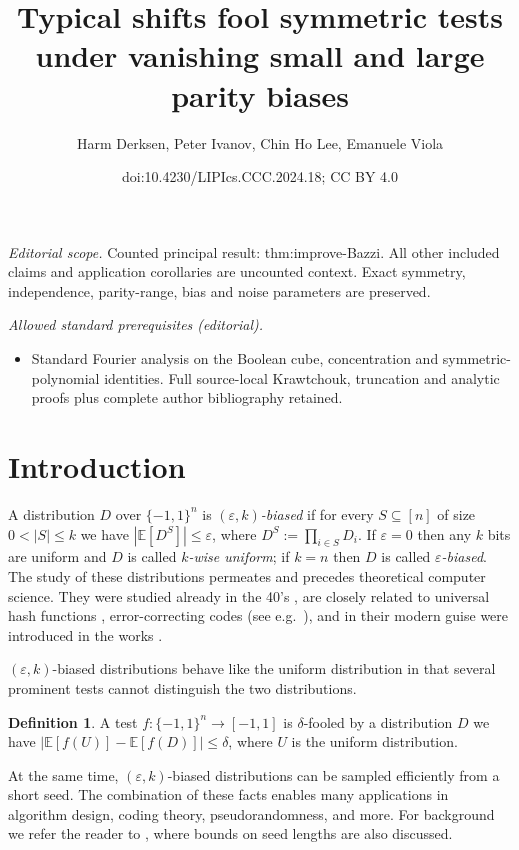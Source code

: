 \documentclass[10pt,a4paper]{article}
\title{Typical shifts fool symmetric tests under vanishing small and large parity biases}
\author{Harm Derksen, Peter Ivanov, Chin Ho Lee, Emanuele Viola}
\date{doi:10.4230/LIPIcs.CCC.2024.18; CC BY 4.0}
\theoremstyle{definition}
\newtheorem{definition}[theorem]{Definition}
\newcommand{\eps}{\epsilon}
\newcommand{\pmo}{\{-1,1\}}
\def\epsilon{\varepsilon}
\begin{document}
\maketitle
\noindent\textit{Editorial scope.} Counted principal result: thm:improve-Bazzi. All other included claims and application corollaries are uncounted context. Exact symmetry, independence, parity-range, bias and noise parameters are preserved.\par\medskip
\noindent\textit{Allowed standard prerequisites (editorial).}\begin{itemize}
\item Standard Fourier analysis on the Boolean cube, concentration and symmetric-polynomial identities. Full source-local Krawtchouk, truncation and analytic proofs plus complete author bibliography retained.
\end{itemize}\medskip
\section{Introduction}
A distribution $D$ over $\{-1,1\}^n$ is \emph{$(\eps,k)$-biased} if for every $S \subseteq [n]$ of size $0 < |S| \le k$ we have $|\mathbb{E}[D^S]| \le \eps$, where $D^S := \prod_{i\in S} D_i$.  If $\eps = 0$ then any $k$ bits are uniform and $D$ is called \emph{$k$-wise uniform}; if $k = n$ then $D$ is called \emph{$\eps$-biased}.  The study of these distributions permeates and precedes theoretical computer science.  They were studied already in the 40's \cite{MR22821}, are closely related to universal hash functions \cite{CaW79}, error-correcting codes (see e.g.~\cite{DBLP:journals/eccc/HatamiH23}), and in their modern guise were introduced in the works \cite{ABI86,ChorGoHaFrRuSm85,NaN90}.

$(\eps,k)$-biased distributions behave like the uniform distribution in that several prominent tests cannot distinguish the two distributions.


\begin{definition} A test $f\colon \pmo^n \to [-1,1]$ is $\delta$-fooled by a distribution $D$ we have $|\mathbb{E}[f(U)] - \mathbb{E}[f(D)]|\le \delta$, where $U$ is the uniform distribution.
\end{definition}

At the same time, $(\eps,k)$-biased distributions can be sampled efficiently from a short seed. The combination of these facts enables many applications in algorithm design, coding theory, pseudorandomness, and more. For background we refer the reader to \cite{Vadhan12,DBLP:journals/eccc/HatamiH23,moti}, where bounds on seed lengths are also discussed.
\end{document}
